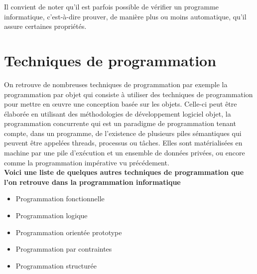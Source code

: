 \documentclass[12pt,a4paper]{article}
\begin{document}

    \newpage


    Il convient de noter qu'il est parfois possible de vérifier un programme informatique, c'est-à-dire prouver, de manière plus ou moins automatique, qu'il assure certaines propriétés.\\


    \section{Techniques de programmation}
    On retrouve de nombreuses techniques de programmation par exemple la programmation par objet qui consiste à utiliser des techniques de programmation pour mettre en œuvre une conception basée sur les objets. Celle-ci peut être élaborée en utilisant des méthodologies de développement logiciel objet, la programmation  concurrente qui est un paradigme de programmation tenant compte, dans un  programme, de l'existence de plusieurs piles sémantiques qui peuvent être appelées threads, processus ou tâches. Elles sont matérialisées en machine par une pile d'exécution et un ensemble de données privées, ou encore comme la programmation impérative vu précédement.\\


    \textbf{Voici une liste de quelques autres techniques de programmation que l'on retrouve dans la programmation informatique}
    \begin{itemize}[leftmargin=50px]
        \item Programmation fonctionnelle
        \item Programmation logique
        \item Programmation orientée prototype
        \item Programmation par contraintes \cite{the}
        \item Programmation structurée
        \label{3}
    \end{itemize}


    \newpage  


    
    
\end{document}
